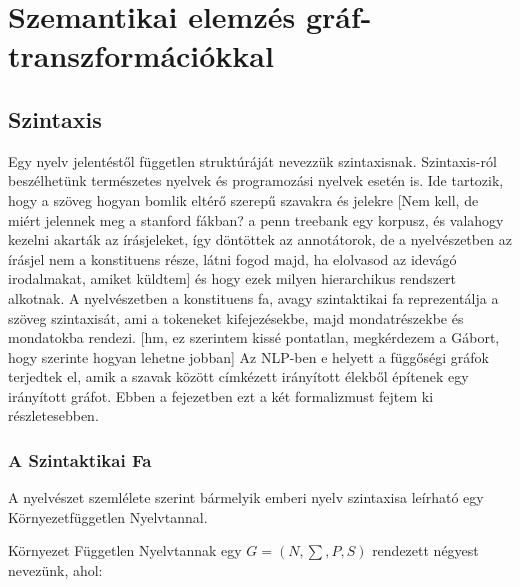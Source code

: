 \chapter{Szemantikai elemzés gráf-transzformációkkal}
\label{sec:SemParsWithGraphTrans}
\section{Szintaxis}
Egy nyelv jelentéstől független struktúráját nevezzük szintaxisnak. Szintaxis-ról beszélhetünk természetes nyelvek és programozási nyelvek esetén is. Ide tartozik, hogy a szöveg hogyan bomlik eltérő szerepű szavakra és jelekre [Nem kell, de miért jelennek meg a stanford fákban? a penn treebank egy korpusz, és valahogy kezelni akarták az írásjeleket, így döntöttek az annotátorok, de a nyelvészetben az írásjel nem a konstituens része, látni fogod majd, ha elolvasod az idevágó irodalmakat, amiket küldtem] és hogy ezek milyen hierarchikus rendszert alkotnak. A nyelvészetben a konstituens fa, avagy szintaktikai fa reprezentálja a szöveg szintaxisát, ami a tokeneket kifejezésekbe, majd mondatrészekbe és mondatokba rendezi. [hm, ez szerintem kissé pontatlan, megkérdezem a Gábort, hogy szerinte hogyan lehetne jobban] Az NLP-ben e helyett a függőségi gráfok terjedtek el, amik a szavak között címkézett irányított élekből építenek egy irányított gráfot. Ebben a fejezetben ezt a két formalizmust fejtem ki részletesebben.

\subsection{A Szintaktikai Fa}
A nyelvészet szemlélete szerint bármelyik emberi nyelv szintaxisa leírható egy Környezetfüggetlen Nyelvtannal.

Környezet Független Nyelvtannak egy $G=(N,\sum ,P,S)$ rendezett négyest nevezünk, ahol:

